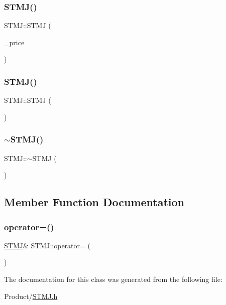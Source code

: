 \subsubsection{\texorpdfstring{STMJ()}{STMJ()}\hspace{0.1cm}{\footnotesize\ttfamily [1/2]}}
{\footnotesize\ttfamily S\+T\+M\+J\+::\+S\+T\+MJ (\begin{DoxyParamCaption}\item[{int}]{\+\_\+price }\end{DoxyParamCaption})}

\mbox{\label{classSTMJ_a932e2bd4822f6a6832ce9458461c0e7f}} 
\subsubsection{\texorpdfstring{STMJ()}{STMJ()}\hspace{0.1cm}{\footnotesize\ttfamily [2/2]}}
{\footnotesize\ttfamily S\+T\+M\+J\+::\+S\+T\+MJ (\begin{DoxyParamCaption}\item[{const \mbox{\hyperlink{classSTMJ}{S\+T\+MJ}} \&}]{ }\end{DoxyParamCaption})}

\mbox{\label{classSTMJ_ad54896782f5156caa09feaa23b634b83}} 
\subsubsection{\texorpdfstring{$\sim$STMJ()}{~STMJ()}}
{\footnotesize\ttfamily S\+T\+M\+J\+::$\sim$\+S\+T\+MJ (\begin{DoxyParamCaption}{ }\end{DoxyParamCaption})}



\subsection{Member Function Documentation}
\mbox{\label{classSTMJ_a62856b0934c8285d47b972ec16b64546}} 
\subsubsection{\texorpdfstring{operator=()}{operator=()}}
{\footnotesize\ttfamily \mbox{\hyperlink{classSTMJ}{S\+T\+MJ}}\& S\+T\+M\+J\+::operator= (\begin{DoxyParamCaption}\item[{const \mbox{\hyperlink{classSTMJ}{S\+T\+MJ}} \&}]{ }\end{DoxyParamCaption})}



The documentation for this class was generated from the following file\+:\begin{DoxyCompactItemize}
\item 
Product/\mbox{\hyperlink{STMJ_8h}{S\+T\+M\+J.\+h}}\end{DoxyCompactItemize}
